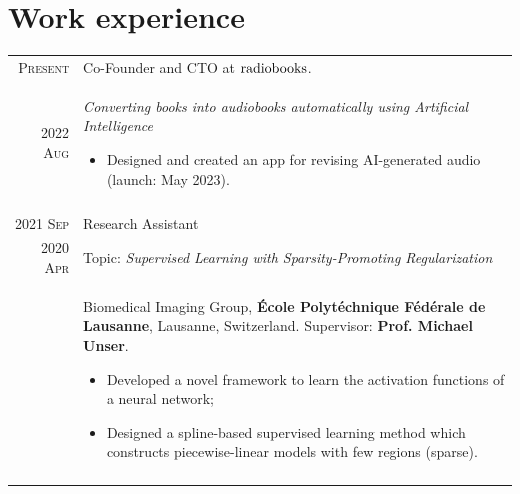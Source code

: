 \documentclass[a4paper,11pt]{article}
\begin{document}
  \vspace{25pt}

  \section{Work experience}

    \begin{tabular}{r|p{13cm}}

      \textsc{Present} 	& Co-Founder and CTO at \href{https://www.radiobooks.io}{$\textnormal{radiobooks}$}. \\
      \textsc{2022 Aug} 	& \emph{Converting books into audiobooks automatically using Artificial Intelligence}
      \begin{itemize}[leftmargin=*,noitemsep]
          \item \footnotesize{Designed and created an app for revising AI-generated audio (launch: May 2023).}
      \end{itemize} \vspace*{-\baselineskip}\\
      \multicolumn{2}{c}{} \\


      \textsc{2021 Sep} 	& Research Assistant \\
      \textsc{2020 Apr} 	& Topic: \emph{Supervised Learning with Sparsity-Promoting Regularization} \\
				& \footnotesize{ Biomedical Imaging Group, \textbf{École Polytéchnique Fédérale de Lausanne}, Lausanne, Switzerland. Supervisor: \textbf{Prof. Michael Unser}.
				  }
        \begin{itemize}[leftmargin=*,noitemsep]
          \item \footnotesize{Developed a novel framework to learn the activation functions of a neural network;}
          \item \footnotesize{Designed a spline-based supervised learning method which constructs piecewise-linear models with few regions (sparse).}
        \end{itemize} \vspace*{-\baselineskip}\\
      \multicolumn{2}{c}{} \\


\end{tabular}
\end{document}
